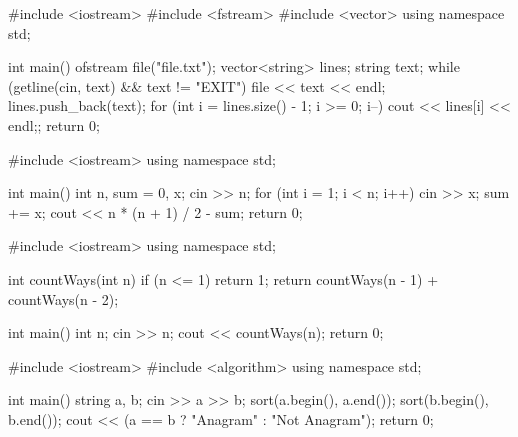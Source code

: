 
\codelabel

\begin{code}
#include <iostream>
#include <fstream>
#include <vector>
using namespace std;

int main() {
    ofstream file("file.txt");
    vector<string> lines;
    string text;
    while (getline(cin, text) && text != "EXIT") {
        file << text << endl;
        lines.push_back(text);
    }
    for (int i = lines.size() - 1; i >= 0; i--) {cout << lines[i] << endl;};
    return 0;
}
\end{code}

\outputlabel
{}


\codelabel

\begin{code}
#include <iostream>
using namespace std;

int main() {
    int n, sum = 0, x;
    cin >> n;
    for (int i = 1; i < n; i++) { cin >> x; sum += x; }
    cout << n * (n + 1) / 2 - sum;
    return 0;
}
\end{code}

\outputlabel
{}


\codelabel

\begin{code}
#include <iostream>
using namespace std;

int countWays(int n) {
    if (n <= 1) return 1;
    return countWays(n - 1) + countWays(n - 2);
}

int main() {
    int n;
    cin >> n;
    cout << countWays(n);
    return 0;
}
\end{code}

\outputlabel
{}


\codelabel

\begin{code}
#include <iostream>
#include <algorithm>
using namespace std;

int main() {
    string a, b;
    cin >> a >> b;
    sort(a.begin(), a.end());
    sort(b.begin(), b.end());
    cout << (a == b ? "Anagram" : "Not Anagram");
    return 0;
}
\end{code}

